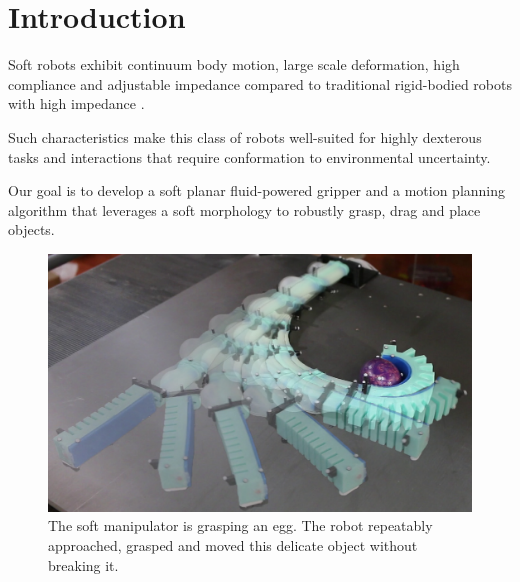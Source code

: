 \section{Introduction}

Soft robots exhibit continuum body motion, large scale deformation, high compliance and adjustable impedance  compared to traditional rigid-bodied robots with high impedance \cite{trivedi2008soft}. 

Such characteristics make this class of robots well-suited for highly dexterous tasks and interactions that require conformation to environmental uncertainty.

Our goal is to develop a soft planar fluid-powered gripper and a motion planning algorithm that leverages a soft morphology to robustly grasp, drag and place objects. 

\begin{figure}[htb]
\centering
   \includegraphics[width=0.9\columnwidth]{Figures/experimental_results/egg_approach/egg_approach_sequence}
   \caption{The soft manipulator is grasping an egg. The robot repeatably approached, grasped and moved this delicate object without breaking it.}
   \label{fig:egg_approach_sequence}
\end{figure}

